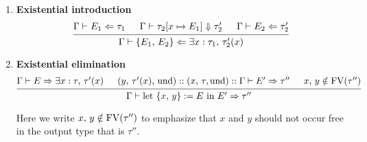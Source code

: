 \documentclass{article}
\begin{document}
\begin{enumerate}
\item \textbf{Existential introduction} \\
\[
    \begin{prooftree}
      \hypo{\Gamma \vdash E_1 \Leftarrow \tau_1}
      \hypo{\Gamma \vdash \tau_2[x \mapsto E_1] \Downarrow \tau_2'}
      \hypo{\Gamma \vdash E_2 \Leftarrow \tau_2'}
      \infer3{\Gamma \vdash \{E_1, \, E_2\} \Leftarrow 
        \exists x : \tau_1, \, \tau_2'(x)}
    \end{prooftree}
\]

\item \textbf{Existential elimination} \\
\[
  \begin{prooftree}
   \hypo{\Gamma \vdash E \Rightarrow \exists x : \tau, \, \tau'(x)} 
   \hypo{(y, \, \tau'(x), \, \text{und}) :: (x, \, \tau, \text{und}) :: \Gamma \vdash
          E' \Rightarrow \tau''}
   \hypo{x, \, y \notin \FV(\tau'')}
   \infer3{\Gamma \vdash \text{let } \{x, \, y\} := E \text{ in } E' \Rightarrow \tau''}
  \end{prooftree}
\]

Here we write $x, \, y \notin \operatorname{FV}(\tau'')$ to emphasize that $x$ and $y$ 
should not occur free in the output type that is $\tau''$.





\end{enumerate}
\end{document}
